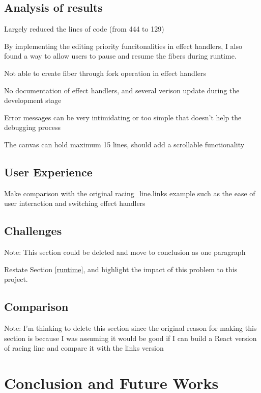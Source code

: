 \documentclass[logo,bsc,singlespacing,parskip]{infthesis}
\begin{document}
\section{Analysis of results}


Largely reduced the lines of code (from 444 to 129)

By implementing the editing priority funcitonalities in effect handlers, I also found a way to allow users to pause and resume the fibers during runtime.

Not able to create fiber through fork operation in effect handlers

No documentation of effect handlers, and several verison update during the development stage

Error messages can be very intimidating or too simple that doesn't help the debugging process

The canvas can hold maximum 15 lines, should add a scrollable functionality

\section{User Experience}

Make comparison with the original racing\_line.links example such as the ease of user interaction and switching effect handlers

\section{Challenges}
Note: This section could be deleted and move to conclusion as one paragraph

Restate Section \ref{runtime}, and highlight the impact of this problem to this project.

\section{Comparison}

Note: I'm thinking to delete this section since the original reason for making this section is because I was assuming it would be good if I can build a React version of racing line and compare it with the links version


\chapter{Conclusion and Future Works}
\label{chap:conclusions}
\end{document}
